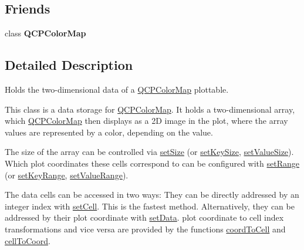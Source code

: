 \subsection*{Friends}
\begin{DoxyCompactItemize}
\item 
class {\bfseries Q\+C\+P\+Color\+Map}\hypertarget{class_q_c_p_color_map_data_ae6b38f708771afd88992c2b46a5c984b}{}\label{class_q_c_p_color_map_data_ae6b38f708771afd88992c2b46a5c984b}

\end{DoxyCompactItemize}


\subsection{Detailed Description}
Holds the two-\/dimensional data of a \hyperlink{class_q_c_p_color_map}{Q\+C\+P\+Color\+Map} plottable. 

This class is a data storage for \hyperlink{class_q_c_p_color_map}{Q\+C\+P\+Color\+Map}. It holds a two-\/dimensional array, which \hyperlink{class_q_c_p_color_map}{Q\+C\+P\+Color\+Map} then displays as a 2D image in the plot, where the array values are represented by a color, depending on the value.

The size of the array can be controlled via \hyperlink{class_q_c_p_color_map_data_a0d9ff35c299d0478b682bfbcdd9c097e}{set\+Size} (or \hyperlink{class_q_c_p_color_map_data_ac7ef70e383aface34b44dbde49234b6b}{set\+Key\+Size}, \hyperlink{class_q_c_p_color_map_data_a0893c9e3914513048b45e3429ffd16f2}{set\+Value\+Size}). Which plot coordinates these cells correspond to can be configured with \hyperlink{class_q_c_p_color_map_data_aad9c1c7c703c1339489fc730517c83d4}{set\+Range} (or \hyperlink{class_q_c_p_color_map_data_a0738c485f3c9df9ea1241b7a8bb6a86e}{set\+Key\+Range}, \hyperlink{class_q_c_p_color_map_data_ada1b2680ba96a5f4175b6d341cf75d23}{set\+Value\+Range}).

The data cells can be accessed in two ways\+: They can be directly addressed by an integer index with \hyperlink{class_q_c_p_color_map_data_a8e75eaf8746596319032a93f3d2d0683}{set\+Cell}. This is the fastest method. Alternatively, they can be addressed by their plot coordinate with \hyperlink{class_q_c_p_color_map_data_afd2083ccfd6987ec94aa7ef8e91ca39a}{set\+Data}. plot coordinate to cell index transformations and vice versa are provided by the functions \hyperlink{class_q_c_p_color_map_data_a26e33c5ec7094b60136350bcd77d3737}{coord\+To\+Cell} and \hyperlink{class_q_c_p_color_map_data_ac96d6e84befe7b9951b5da6d4d4a2a47}{cell\+To\+Coord}.

